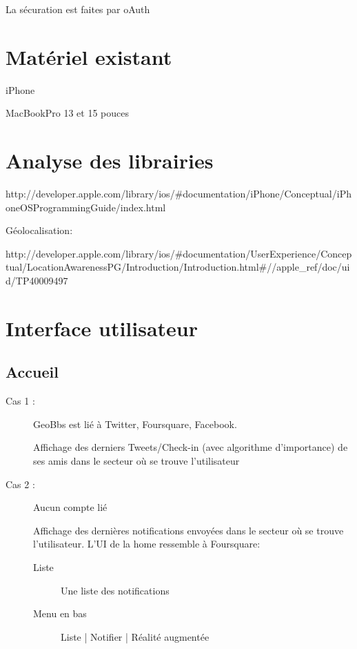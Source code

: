 \documentclass[a4paper,12pt]{report}
\begin{document}
\begin{onehalfspace}
La sécuration est faites par oAuth

\chapter*{Matériel existant}
iPhone

MacBookPro 13 et 15 pouces

\chapter*{Analyse des librairies}

http://developer.apple.com/library/ios/#documentation/iPhone/Conceptual/iPhoneOSProgrammingGuide/index.html

Géolocalisation:

http://developer.apple.com/library/ios/#documentation/UserExperience/Conceptual/LocationAwarenessPG/Introduction/Introduction.html#//apple_ref/doc/uid/TP40009497

\chapter*{Interface utilisateur}
  \section*{Accueil}
  \begin{description}
    \item[Cas 1 :] GeoBbs est lié à Twitter, Foursquare, Facebook.

    Affichage des derniers Tweets/Check-in (avec algorithme d’importance) de ses amis dans le secteur où se trouve l’utilisateur

    \item[Cas 2 :] Aucun compte lié

    Affichage des dernières notifications envoyées dans le secteur où se trouve l’utilisateur.
    L’UI de la home ressemble à Foursquare:
      \begin{description}
      \item[Liste] Une liste des notifications
      \item[Menu en bas] Liste | Notifier | Réalité augmentée
      \end{description}
  \end{description}

  \end{onehalfspace}
\end{document}
